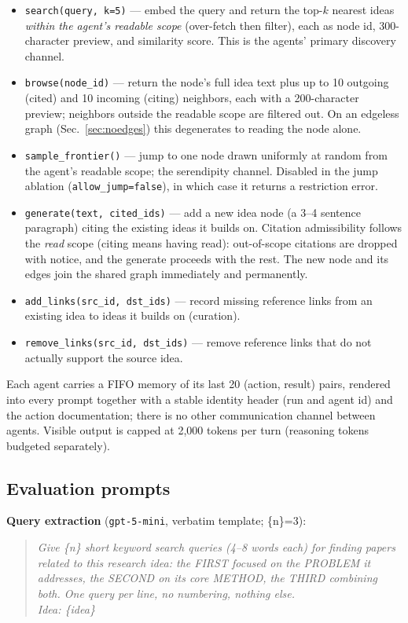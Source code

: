 \documentclass{article} %
\begin{document}
\begin{itemize}
\item \texttt{search(query, k{=}5)} --- embed the query and return the
  top-$k$ nearest ideas \emph{within the agent's readable scope}
  (over-fetch then filter), each as node id, 300-character preview, and
  similarity score. This is the agents' primary discovery channel.
\item \texttt{browse(node\_id)} --- return the node's full idea text
  plus up to 10 outgoing (cited) and 10 incoming (citing) neighbors,
  each with a 200-character preview; neighbors outside the readable
  scope are filtered out. On an edgeless graph
  (Sec.~\ref{sec:noedges}) this degenerates to reading the node alone.
\item \texttt{sample\_frontier()} --- jump to one node drawn uniformly
  at random from the agent's readable scope; the serendipity channel.
  Disabled in the jump ablation (\texttt{allow\_jump{=}false}), in
  which case it returns a restriction error.
\item \texttt{generate(text, cited\_ids)} --- add a new idea node (a
  3--4 sentence paragraph) citing the existing ideas it builds on.
  Citation admissibility follows the \emph{read} scope (citing means
  having read): out-of-scope citations are dropped with notice, and the
  generate proceeds with the rest. The new node and its edges join the
  shared graph immediately and permanently.
\item \texttt{add\_links(src\_id, dst\_ids)} --- record missing
  reference links from an existing idea to ideas it builds on
  (curation).
\item \texttt{remove\_links(src\_id, dst\_ids)} --- remove reference
  links that do not actually support the source idea.
\end{itemize}

Each agent carries a FIFO memory of its last 20 (action, result) pairs,
rendered into every prompt together with a stable identity header (run
and agent id) and the action documentation; there is no other
communication channel between agents. Visible output is capped at
2{,}000 tokens per turn (reasoning tokens budgeted separately).

\subsection{Evaluation prompts}
\label{app:evalprompts}

\textbf{Query extraction} (\texttt{gpt-5-mini}, verbatim template;
\{n\}=3):
\begin{quote}\small\itshape
Give \{n\} short keyword search queries (4--8 words each) for finding
papers related to this research idea: the FIRST focused on the PROBLEM
it addresses, the SECOND on its core METHOD, the THIRD combining both.
One query per line, no numbering, nothing else. \\ Idea: \{idea\}
\end{quote}
\end{document}
